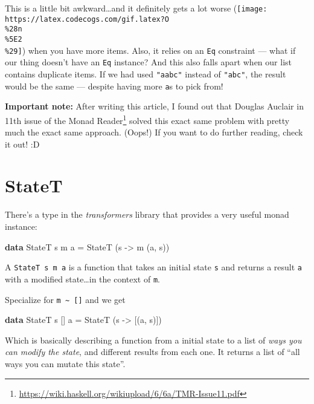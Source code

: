 \documentclass[]{article}
\newenvironment{Shaded}{}{}
\newcommand{\KeywordTok}[1]{\textcolor[rgb]{0.00,0.44,0.13}{\textbf{#1}}}
\newcommand{\DataTypeTok}[1]{\textcolor[rgb]{0.56,0.13,0.00}{#1}}
\newcommand{\OtherTok}[1]{\textcolor[rgb]{0.00,0.44,0.13}{#1}}
\newcommand{\FunctionTok}[1]{\textcolor[rgb]{0.02,0.16,0.49}{#1}}
\newcommand{\NormalTok}[1]{#1}
\renewcommand{\href}[2]{#2\footnote{\url{#1}}}
\begin{document}
This is a little bit awkward\ldots{}and it definitely gets a lot worse
(\texttt{[image: https://latex.codecogs.com/gif.latex?O\\\%28n\\\%5E2\\\%29]}) when
you have more items. Also, it relies on an \texttt{Eq} constraint --- what if
our thing doesn't have an \texttt{Eq} instance? And this also falls apart when
our list contains duplicate items. If we had used \texttt{"aabc"} instead of
\texttt{"abc"}, the result would be the same --- despite having more
\texttt{\textquotesingle{}a\textquotesingle{}}s to pick from!

\textbf{Important note:} After writing this article, I found out that Douglas
Auclair in \href{https://wiki.haskell.org/wikiupload/6/6a/TMR-Issue11.pdf}{11th
issue of the Monad Reader} solved this exact same problem with pretty much the
exact same approach. (Oops!) If you want to do further reading, check it out! :D

\section{StateT}\label{statet}

There's a type in the \emph{transformers} library that provides a very useful
monad instance:

\begin{Shaded}
\begin{Highlighting}[]
\KeywordTok{data} \DataTypeTok{StateT}\NormalTok{ s m a }\FunctionTok{=} \DataTypeTok{StateT}\NormalTok{ (s }\OtherTok{->}\NormalTok{ m (a, s))}
\end{Highlighting}
\end{Shaded}

A \texttt{StateT\ s\ m\ a} is a function that takes an initial state \texttt{s}
and returns a result \texttt{a} with a modified state\ldots{}in the context of
\texttt{m}.

Specialize for \texttt{m\ \textasciitilde{}\ {[}{]}} and we get

\begin{Shaded}
\begin{Highlighting}[]
\KeywordTok{data} \DataTypeTok{StateT}\NormalTok{ s [] a }\FunctionTok{=} \DataTypeTok{StateT}\NormalTok{ (s }\OtherTok{->}\NormalTok{ [(a, s)])}
\end{Highlighting}
\end{Shaded}

Which is basically describing a function from a initial state to a list of
\emph{ways you can modify the state}, and different results from each one. It
returns a list of ``all ways you can mutate this state''.
\end{document}
